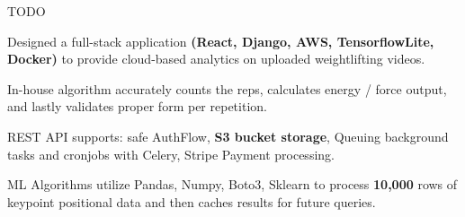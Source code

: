

\begin{cventries}

  \cventry
    {
    }
    {}
    {}
    {}
    {
     \begin{cvitems} %
        \item{TODO}
      \end{cvitems}
    }

  \cventry
    {
    } %
    {} %
    {} %
    {} %
    {
      \begin{cvitems} %
        \item {Designed a full-stack application \textbf{(React, Django, AWS, TensorflowLite, Docker)} to provide cloud-based analytics on uploaded weightlifting videos.}
        \item{In-house algorithm accurately counts the reps, calculates energy / force output, and lastly validates proper form per repetition.}
        \item{REST API supports: safe AuthFlow, \textbf{S3 bucket storage}, Queuing background tasks and cronjobs with Celery, Stripe Payment processing.}
        \item{ML Algorithms utilize Pandas, Numpy, Boto3, Sklearn to process \textbf{10,000} rows of keypoint positional data and then caches results for future queries.}
      \end{cvitems}
    }



\end{cventries}

